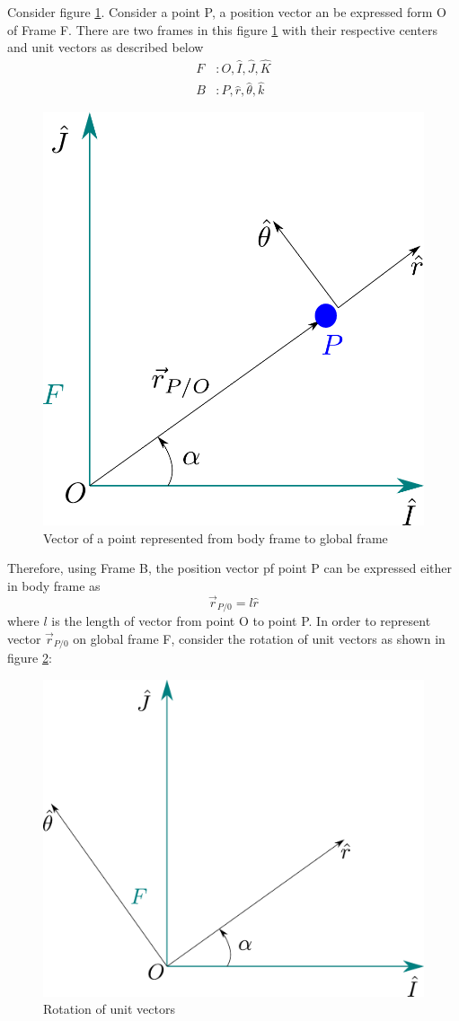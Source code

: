 Consider figure \ref{Fig_0_ch_0_TT_2}. Consider a point P, a position vector an be expressed form O of Frame F. There are two frames in this figure \ref{Fig_0_ch_0_TT_2} with their respective centers and unit vectors as described below
\begin{align*}
	F &: {O,\hat{I},\hat{J},\hat{K}} \\
	B &: {P,\hat{r},\hat{\theta},\hat{k}}
\end{align*}
\begin{figure}[h!]
	\centering
	\includegraphics[width=0.5\linewidth]{Bilder/02_derivativeRule_derivation.pdf}
	\caption{Vector of a point represented from body frame to global frame}
	\label{Fig_0_ch_0_TT_2}
\end{figure}
Therefore, using Frame B, the position vector pf point P can be expressed either in body frame as
\begin{equation} \label{Eq_0_ch_0_posVec}
\vec{r}_{P/0} = l \hat{r}
\end{equation}
where $l$ is the length of vector from point O to point P. In order to represent vector $\vec{r}_{P/0}$ on global frame F, consider the rotation of unit vectors as shown in figure \ref{Fig_0_ch_0_TT_3}:
\newpage
\begin{figure}[h!]
	\centering
	\includegraphics[width=0.5\linewidth]{Bilder/03_UnitVetors_Rotation.pdf}
	\caption{Rotation of unit vectors}
	\label{Fig_0_ch_0_TT_3}
\end{figure}
